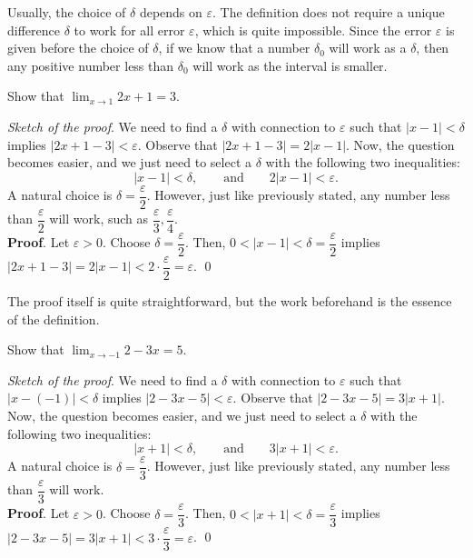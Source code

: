 \documentclass[11pt]{book}
\begin{document}
\begin{remark}
    Usually, the choice of $\delta$ depends on $\varepsilon$. The definition does not require a unique difference $\delta$ to work for all error $\varepsilon$, which is quite impossible. Since the error $\varepsilon$ is given before the choice of $\delta$, if we know that a number $\delta_0$ will work as a $\delta$, then any positive number less than $\delta_0$ will work as the interval is smaller.
\end{remark}

\begin{example}
    Show that $\displaystyle\lim_{x\to 1}2x+1=3.$
\end{example}
\textit{Sketch of the proof}. We need to find a $\delta$ with connection to $\varepsilon$ such that $|x-1|<\delta$ implies $|2x+1-3|<\varepsilon$. Observe that $|2x+1-3|=2|x-1|$. Now, the question becomes easier, and we just need to select a $\delta$ with the following two inequalities: 
\begin{equation*}
    |x-1|<\delta, \qquad\text{and}\qquad 2|x-1|<\varepsilon.
\end{equation*}
A natural choice is $\delta=\dfrac{\varepsilon}{2}$. However, just like previously stated, any number less than $\dfrac{\varepsilon}{2}$ will work, such as $\dfrac{\varepsilon}{3}, \dfrac{\varepsilon}{4}$.\\
\textbf{Proof}. Let $\varepsilon>0$. Choose $\delta=\dfrac{\varepsilon}{2}$. Then, $0<|x-1|<\delta=\dfrac{\varepsilon}{2}$ implies $|2x+1-3|=2|x-1|<2\cdot\dfrac{\varepsilon}{2}=\varepsilon$. \qed

The proof itself is quite straightforward, but the work beforehand is the essence of the definition.

\begin{example}
    Show that $\displaystyle\lim_{x\to -1}2-3x=5.$
\end{example}
\textit{Sketch of the proof}. We need to find a $\delta$ with connection to $\varepsilon$ such that $|x-(-1)|<\delta$ implies $|2-3x-5|<\varepsilon$. Observe that $|2-3x-5|=3|x+1|$. Now, the question becomes easier, and we just need to select a $\delta$ with the following two inequalities: 
\begin{equation*}
    |x+1|<\delta, \qquad\text{and}\qquad 3|x+1|<\varepsilon.
\end{equation*}
A natural choice is $\delta=\dfrac{\varepsilon}{3}$. However, just like previously stated, any number less than $\dfrac{\varepsilon}{3}$ will work.\\
\textbf{Proof}. Let $\varepsilon>0$. Choose $\delta=\dfrac{\varepsilon}{3}$. Then, $0<|x+1|<\delta=\dfrac{\varepsilon}{3}$ implies $|2-3x-5|=3|x+1|<3\cdot\dfrac{\varepsilon}{3}=\varepsilon$. \qed
\end{document}
